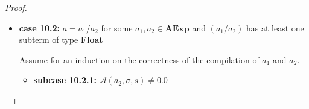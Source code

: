 \documentclass{article}
\begin{document}
\begin{proof}
\begin{itemize}
\begin{itemize}
            \[
              \begin{aligned}
                \langle  \mathcal{CA}(a) : c,\, e,\, \sigma,\, s,\, pc \rangle 
                &= \langle \mathcal{CA}(a_1 / a_2) : c,\, e,\, \sigma,\, s,\, pc \rangle \\
                &= \langle \mathcal{CA}(a_2) : \mathcal{CA}(a_1) : \texttt{iDIV} :  c,\, e,\, \sigma,\, s,\, pc \rangle 
                && \text{(definition of $\mathcal{CA}$)} \\
                &\triangleright^{\ast} \langle \mathcal{CA}(a_1) : \texttt{iDIV} :  c,\, \mathcal{A}(a_2, \sigma, s) : e,\, \sigma,\, s,\, pc + l_2 \rangle 
                && \text{(induction hypothesis 2)} \\
                &= \langle \mathcal{CA}(a_1) : \texttt{iDIV} :  c,\, 0 : e,\, \sigma,\, s,\, pc + l_2 \rangle \\
                &\triangleright^{\ast} \langle \texttt{iDIV} :  c,\, \mathcal{A}(a_1, \sigma, s) : 0 : e,\, \sigma,\, s,\, pc + l_2 + l_1 \rangle 
                && \text{(induction hypothesis 1)} \\
                &\triangleright \langle c,\, \bot : e,\, \hat{\sigma},\, s,\, pc + l_2 + l_1 + 1 \rangle 
                && \text{(operational semantics)} \\
                &= \langle c,\, \mathcal{A}(a_1 / a_2, \sigma, s) : e,\, \hat{\sigma},\, s,\, pc + l_2 + l_1 + 1 \rangle
                && \text{(definition of $\mathcal{A}$)} \\
                &= \langle c,\, \mathcal{A}(a, \sigma, s) : e,\, \hat{\sigma},\, s,\, pc + l_2 + l_1 + 1 \rangle \\
              \end{aligned}
          \]
            
        \end{itemize}

    \item \textbf{case 10.2: } $a = a_1 / a_2$ for some $a_1, a_2 \in \textbf{AExp}$ and $(a_1 / a_2)$ has at least one subterm of type \textbf{Float}

    Assume for an induction on the correctness of the compilation of $a_1$ and $a_2$.

        \begin{itemize}
            \item \textbf{subcase 10.2.1: } $\mathcal{A}(a_2, \sigma, s) \neq 0.0$


\end{itemize}
\end{itemize}
\end{proof}
\end{document}
